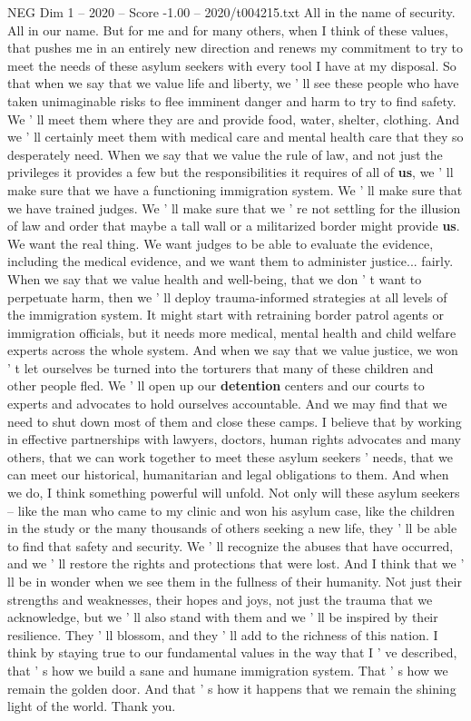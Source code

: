 \begin{textsample}{NEG Dim 1 – 2020 – Score -1.00 – 2020/t004215.txt}
All in the name of security.
All in our name.
But for me and for many others, when I think of these values, that pushes me in an entirely new direction and renews my commitment to try to meet the needs of these asylum seekers with every tool I have at my disposal.
So that when we say that we value life and liberty, we ' ll see these people who have taken unimaginable risks to flee imminent danger and harm to try to find safety.
We ' ll meet them where they are and provide food, water, shelter, clothing.
And we ' ll certainly meet them with medical care and mental health care that they so desperately need.
When we say that we value the rule of law, and not just the privileges it provides a few but the responsibilities it requires of all of \textbf{us}, we ' ll make sure that we have a functioning immigration system.
We ' ll make sure that we have trained judges.
We ' ll make sure that we ' re not settling for the illusion of law and order that maybe a tall wall or a militarized border might provide \textbf{us}.
We want the real thing.
We want judges to be able to evaluate the evidence, including the medical evidence, and we want them to administer justice... fairly.
When we say that we value health and well-being, that we don ' t want to perpetuate harm, then we ' ll deploy trauma-informed strategies at all levels of the immigration system.
It might start with retraining border patrol agents or immigration officials, but it needs more medical, mental health and child welfare experts across the whole system.
And when we say that we value justice, we won ' t let ourselves be turned into the torturers that many of these children and other people fled.
We ' ll open up our \textbf{detention} centers and our courts to experts and advocates to hold ourselves accountable.
And we may find that we need to shut down most of them and close these camps.
I believe that by working in effective partnerships with lawyers, doctors, human rights advocates and many others, that we can work together to meet these asylum seekers ' needs, that we can meet our historical, humanitarian and legal obligations to them.
And when we do, I think something powerful will unfold.
Not only will these asylum seekers -- like the man who came to my clinic and won his asylum case, like the children in the study or the many thousands of others seeking a new life, they ' ll be able to find that safety and security.
We ' ll recognize the abuses that have occurred, and we ' ll restore the rights and protections that were lost.
And I think that we ' ll be in wonder when we see them in the fullness of their humanity.
Not just their strengths and weaknesses, their hopes and joys, not just the trauma that we acknowledge, but we ' ll also stand with them and we ' ll be inspired by their resilience.
They ' ll blossom, and they ' ll add to the richness of this nation.
I think by staying true to our fundamental values in the way that I ' ve described, that ' s how we build a sane and humane immigration system.
That ' s how we remain the golden door.
And that ' s how it happens that we remain the shining light of the world.
Thank you.

\end{textsample}
